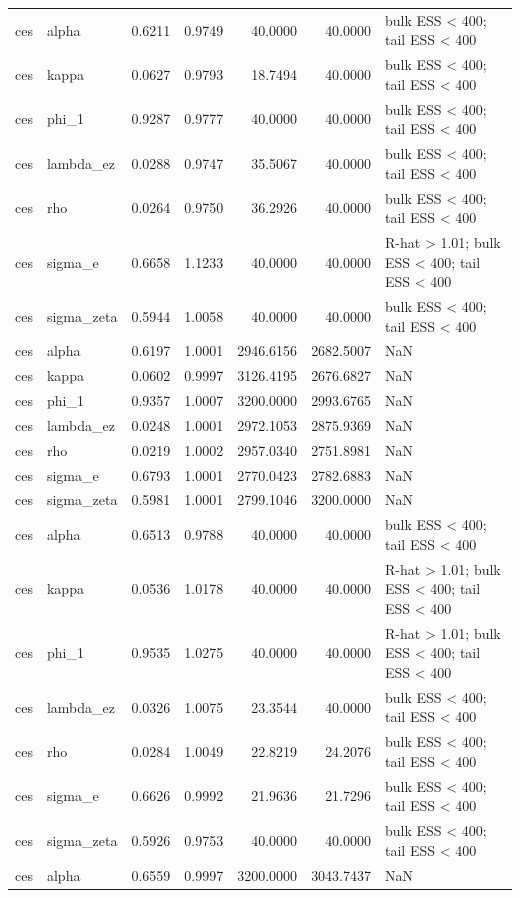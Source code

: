 \begin{tabular}{llrrrrl}
ces & alpha & 0.6211 & 0.9749 & 40.0000 & 40.0000 & bulk ESS < 400; tail ESS < 400 \\
ces & kappa & 0.0627 & 0.9793 & 18.7494 & 40.0000 & bulk ESS < 400; tail ESS < 400 \\
ces & phi\_1 & 0.9287 & 0.9777 & 40.0000 & 40.0000 & bulk ESS < 400; tail ESS < 400 \\
ces & lambda\_ez & 0.0288 & 0.9747 & 35.5067 & 40.0000 & bulk ESS < 400; tail ESS < 400 \\
ces & rho & 0.0264 & 0.9750 & 36.2926 & 40.0000 & bulk ESS < 400; tail ESS < 400 \\
ces & sigma\_e & 0.6658 & 1.1233 & 40.0000 & 40.0000 & R-hat > 1.01; bulk ESS < 400; tail ESS < 400 \\
ces & sigma\_zeta & 0.5944 & 1.0058 & 40.0000 & 40.0000 & bulk ESS < 400; tail ESS < 400 \\
ces & alpha & 0.6197 & 1.0001 & 2946.6156 & 2682.5007 & NaN \\
ces & kappa & 0.0602 & 0.9997 & 3126.4195 & 2676.6827 & NaN \\
ces & phi\_1 & 0.9357 & 1.0007 & 3200.0000 & 2993.6765 & NaN \\
ces & lambda\_ez & 0.0248 & 1.0001 & 2972.1053 & 2875.9369 & NaN \\
ces & rho & 0.0219 & 1.0002 & 2957.0340 & 2751.8981 & NaN \\
ces & sigma\_e & 0.6793 & 1.0001 & 2770.0423 & 2782.6883 & NaN \\
ces & sigma\_zeta & 0.5981 & 1.0001 & 2799.1046 & 3200.0000 & NaN \\
ces & alpha & 0.6513 & 0.9788 & 40.0000 & 40.0000 & bulk ESS < 400; tail ESS < 400 \\
ces & kappa & 0.0536 & 1.0178 & 40.0000 & 40.0000 & R-hat > 1.01; bulk ESS < 400; tail ESS < 400 \\
ces & phi\_1 & 0.9535 & 1.0275 & 40.0000 & 40.0000 & R-hat > 1.01; bulk ESS < 400; tail ESS < 400 \\
ces & lambda\_ez & 0.0326 & 1.0075 & 23.3544 & 40.0000 & bulk ESS < 400; tail ESS < 400 \\
ces & rho & 0.0284 & 1.0049 & 22.8219 & 24.2076 & bulk ESS < 400; tail ESS < 400 \\
ces & sigma\_e & 0.6626 & 0.9992 & 21.9636 & 21.7296 & bulk ESS < 400; tail ESS < 400 \\
ces & sigma\_zeta & 0.5926 & 0.9753 & 40.0000 & 40.0000 & bulk ESS < 400; tail ESS < 400 \\
ces & alpha & 0.6559 & 0.9997 & 3200.0000 & 3043.7437 & NaN \\

\end{tabular}

